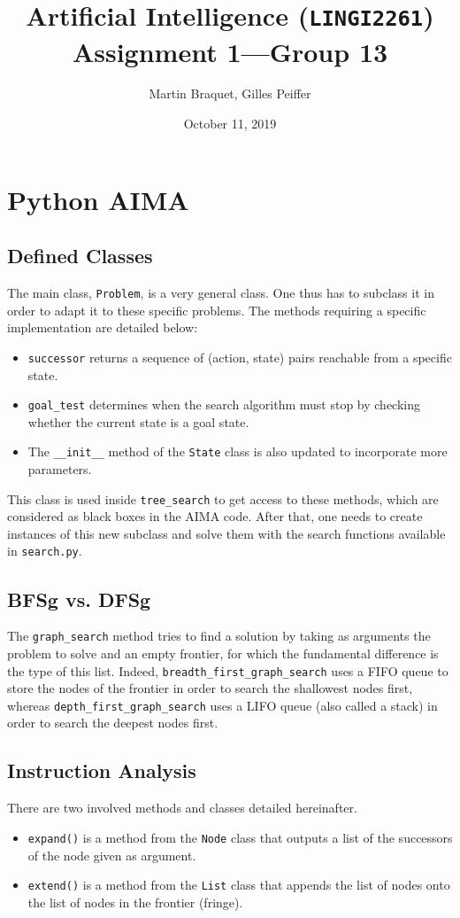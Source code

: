 \documentclass[journal]{IEEEtran}
\title{Artificial Intelligence (\texttt{LINGI2261}) \\ Assignment 1---Group 13}
\author{Martin Braquet, Gilles Peiffer}
\date{October 11, 2019}
\newcommand{\py}[1]{\texttt{#1}}
\begin{document}
\maketitle

\section{Python AIMA}
\subsection{Defined Classes}
The main class, \py{Problem}, is a very general class. One thus has to subclass it in order to adapt it to these specific problems.
 The methods requiring a specific implementation are detailed below:
 \begin{itemize}
  \item \py{successor} returns a sequence of (action, state) pairs reachable from a specific state.
  \item \py{goal_test} determines when the search algorithm must stop by checking whether the current state is a goal state.
  \item The \py{__init__} method of the \py{State} class is also updated to incorporate more parameters.
 \end{itemize}
This class is used inside \py{tree_search} to get access to these methods, which are considered as black boxes in the AIMA code.
 After that, one needs to create instances of this new subclass and solve them with the search functions available in \py{search.py}.
 \subsection{BFSg vs. DFSg}
 The \py{graph_search} method tries to find a solution by taking as arguments the problem to solve and an empty frontier, for which the fundamental difference is the type of this list.
 Indeed, \py{breadth_first_graph_search} uses a FIFO queue to store the nodes of the frontier in order to search the shallowest nodes first, whereas \py{depth_first_graph_search} uses a LIFO queue  (also called a stack) in order to search the deepest nodes first.
 \subsection{Instruction Analysis}
 There are two involved methods and classes detailed hereinafter.
 \begin{itemize}
 	\item \py{expand()} is a method from the \py{Node} class that outputs a list of the successors of the node given as argument.
 	\item \py{extend()} is a method from the \py{List} class that appends the list of nodes onto the list of nodes in the frontier (fringe).
 \end{itemize}
\end{document}
